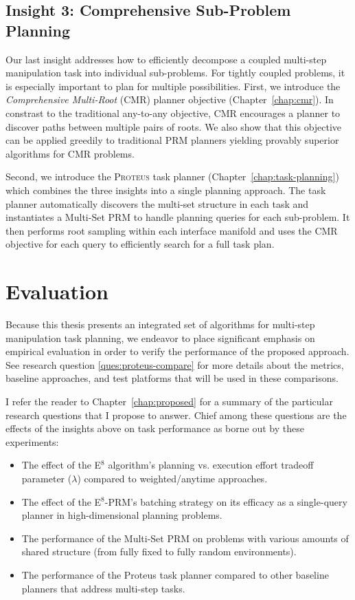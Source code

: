 \subsection*{Insight 3: Comprehensive Sub-Problem Planning}

Our last insight addresses how to efficiently decompose a coupled
multi-step manipulation task into individual sub-problems.
For tightly coupled problems,
it is especially important to plan for multiple possibilities.
First, we introduce the \emph{Comprehensive Multi-Root} (CMR) planner
objective (Chapter~\ref{chap:cmr}).
In constrast to the traditional any-to-any objective,
CMR encourages a planner to discover paths between multiple pairs of
roots.
We also show that this objective can be applied greedily
to traditional PRM planners
yielding provably superior algorithms for CMR problems. 

Second,
we introduce the \textsc{Proteus} task planner
(Chapter~\ref{chap:task-planning})
which combines the three insights into a single planning approach.
The task planner
automatically discovers the multi-set structure in each task
and instantiates a Multi-Set PRM to handle planning queries
for each sub-problem.
It then performs root sampling within each interface manifold
and uses the CMR objective for each query to
efficiently search for a full task plan.

\section*{Evaluation}

Because this thesis presents an integrated set of algorithms
for multi-step manipulation task planning,
we endeavor to place significant emphasis on empirical evaluation
in order to verify the performance of the proposed approach.
See research question \ref{ques:proteus-compare} for more details
about the metrics, baseline approaches, and test platforms
that will be used in these comparisons.

I refer the reader to Chapter~\ref{chap:proposed} for a summary
of the particular research questions that I propose to answer.
Chief among these questions are the effects of the insights above
on task performance as borne out by these experiments:
\begin{itemize}
\itemsep-3pt
\item The effect of the E$^8$ algorithm's planning vs. execution
   effort tradeoff parameter ($\lambda$)
   compared to weighted/anytime approaches.
\item The effect of the E$^8$-PRM's batching strategy on its efficacy
   as a single-query planner in high-dimensional planning
   problems.
\item The performance of the Multi-Set PRM on problems with various
   amounts of shared structure
   (from fully fixed to fully random environments).
\item The performance of the {\sc Proteus} task planner
   compared to other baseline planners that address multi-step tasks.
\end{itemize}

